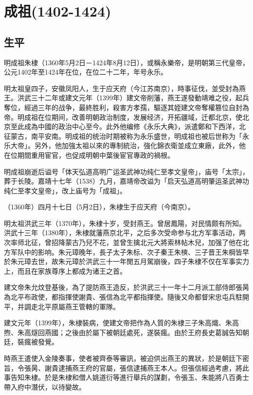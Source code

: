 
\section{成祖\tiny(1402-1424)}

\subsection{生平}

明成祖朱棣（1360年5月2日－1424年8月12日），或稱永樂帝，是明朝第三代皇帝，公元1402年至1424年在位，在位二十二年，年号永乐。

明太祖皇四子，安徽凤阳人，生于应天府（今江苏南京），時事征伐，並受封為燕王。洪武三十二年或建文元年（1399年）建文帝削藩，燕王遂發動靖难之役，起兵奪位，經過三年的战争，最終胜利，殺害方孝孺，驅逐其姪建文帝奪權篡位自封為帝。明成祖在位期间，改善明朝政治制度，发展经济，开拓疆域，迁都北京，使北京至此成為中國的政治中心至今。此外他编修《永乐大典》，派遣鄭和下西洋，北征蒙古，南平安南。明成祖的统治时期被称为永乐盛世，明成祖也被后世称为「永乐大帝」。另外，他加強太祖以來的專制統治，強化錦衣衛並成立東廠，此外，他在位期間重用宦官，也促成明朝中葉後宦官專政的禍根。

明成祖崩逝后谥号「体天弘道高明广运圣武神功纯仁至孝文皇帝」，庙号「太宗」，葬于长陵。嘉靖十七年（1538）九月，嘉靖帝改谥为「启天弘道高明肇运圣武神功纯仁至孝文皇帝」，改上庙号为「成祖」。

（1360年）四月十七日（5月2日），朱棣生于应天府（今南京）。

明太祖洪武三年（1370年），朱棣十岁，受封燕王。曾居鳳陽，对民情颇有所知。洪武十三年（1380年），朱棣就藩燕京北平，之后多次受命参与北方军事活动，两次率师北征，曾招降蒙古乃兒不花，並曾生擒北元大將索林帖木兒，加强了他在北方军队中的影响。朱元璋晚年，長子太子朱标、次子秦王朱樉、三子晋王朱棡皆早於朱元璋去世，故朱元璋於洪武三十一年閒五月駕崩後，四子朱棣不仅在军事实力上，而且在家族尊序上都成为诸王之首。

建文帝朱允炆登基後，為了提防燕王造反，於洪武三十一年十二月派工部侍郎張昺為北平布政使，都指揮使謝貴、張信為北平都指揮使。隨後又命都督宋忠屯兵駐開平，并調走北平原屬燕王管轄的軍隊。

建文元年（1399年），朱棣裝病，使建文帝把作為人質的朱棣三子朱高熾、朱高煦、朱高燧回燕國；之後由於屬下被朝廷處死，遂裝瘋。由於王府長史葛誠告知朝廷，裝瘋被發覺。

時燕王遣使入金陵奏事，使者被齊泰等審訊，被迫供出燕王的異狀，於是朝廷下密旨，令張昺、謝貴逮捕燕王府的官屬，張信逮捕燕王本人。但張信經過考慮，將此事告知朱棣。於是朱棣和僧人姚道衍等進行舉兵的謀劃，令張玉、朱能將八百勇士帶入府中潛伏，以待變故。

